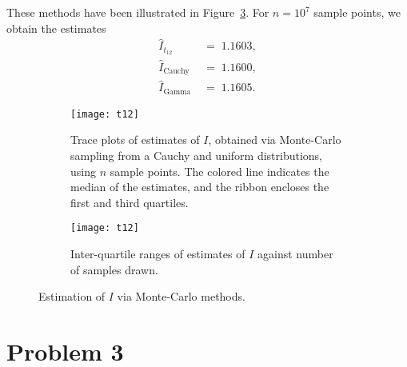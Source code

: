 \documentclass[10pt]{article}
\begin{document}
    These methods have been illustrated in Figure~\ref{fig:P2}. For $n = 10^7$
    sample points, we obtain the estimates
    \begin{align*}
        \hat{I}_{t_{12}} \;&=\; 1.1603, \\
        \hat{I}_{\text{Cauchy}} \;&=\; 1.1600, \\
        \hat{I}_{\text{Gamma}} \;&=\; 1.1605.
    \end{align*}


    \begin{figure}[H]
        \centering
        \begin{subfigure}{\textwidth}
            \centering
            \texttt{[image: t12]}
            \caption{
                Trace plots of estimates of $I$, obtained via Monte-Carlo
                sampling from a Cauchy and uniform distributions, using $n$
                sample points.
                The colored line indicates the median of the estimates, and
                the ribbon encloses the first and third quartiles.
            }
            \label{fig:P2_trace}
        \end{subfigure}

        \vspace{2em}
        \begin{subfigure}{\textwidth}
            \centering
            \texttt{[image: t12]}
            \caption{
                Inter-quartile ranges of estimates of $I$ against number of
                samples drawn.
            }
            \label{fig:P2_IQR}
        \end{subfigure}
        \caption{Estimation of $I$ via Monte-Carlo methods.}
        \label{fig:P2}
    \end{figure}


    \clearpage

    \section*{Problem 3}
\end{document}
